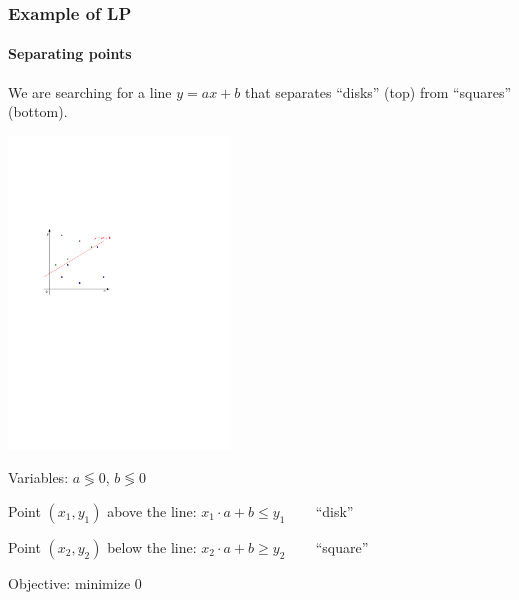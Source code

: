 \documentclass{beamer}
\renewcommand{\.}{\hskip .75pt}
\begin{document}
\begin{frame}
	\frametitle{Example of LP}
	\framesubtitle{Separating points}
	We are searching for a line $y = ax + b$ that separates \textcolor{dgreen}{``disks'' (top)} from \textcolor{dblue}{``squares'' (bottom)}.
	
	\vspace*{-8pt}
	\hfil\hfil\hfil\hfil\hfil\hfil\hfil\hfil\hfil\hfil\hfil\hfil\hfil\hfil\hfil\hfil \includegraphics[width=0.44\textwidth]{separating}
	\vspace*{-8pt}
	
	\pause
	Variables: \pause $a \lessgtr 0$, $b \lessgtr 0$
	
	\pause
	Point $(x_1, y_1)$ above the line: \pause $x_1 \cdot a + b \le y_1$ ~~~ \textcolor{dgreen}{``disk''}
	
	\pause
	Point $(x_2, y_2)$ below the line: \pause $x_2 \cdot a + b \ge y_2$ ~~~ \textcolor{dblue}{``square''}
	
	\pause
	Objective: \pause minimize 0
\end{frame}
\end{document}
